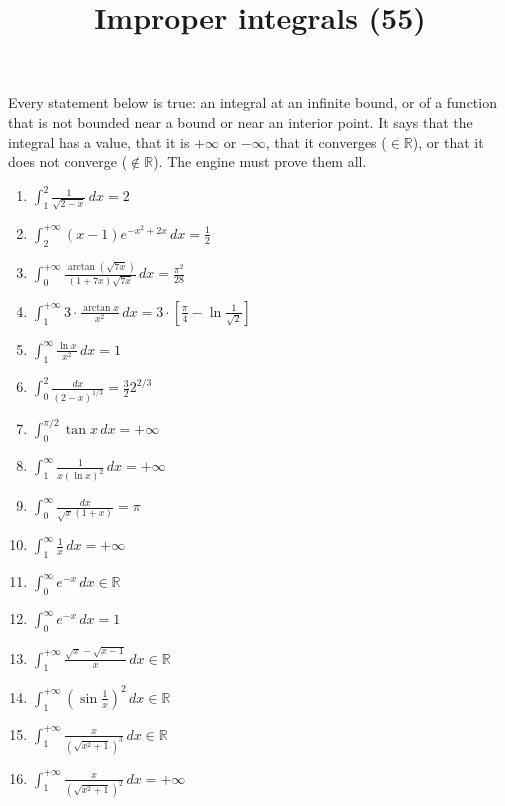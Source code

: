\documentclass[11pt,a4paper]{article}
\title{Improper integrals (55)}
\author{}
\date{}
\begin{document}
\maketitle
Every statement below is true: an integral at an infinite bound, or of a function that is not bounded near a bound or near an interior point. It says that the integral has a value, that it is $+\infty$ or $-\infty$, that it converges ($\in \mathbb{R}$), or that it does not converge ($\notin \mathbb{R}$). The engine must prove them all.

\begin{enumerate}
\item $\displaystyle \int_{1}^{2} \frac{1}{\sqrt{2 - x}} \, dx = 2$
\item $\displaystyle \int_{2}^{+\infty} (x - 1) e^{-x^{2} + 2x} \, dx = \frac{1}{2}$
\item $\displaystyle \int_{0}^{+\infty} \frac{\arctan\left(\sqrt{7x}\right)}{(1 + 7x)\sqrt{7x}} \, dx = \frac{\pi^{2}}{28}$
\item $\displaystyle \int_{1}^{+\infty} 3 \cdot \frac{\arctan x}{x^{2}} \, dx = 3 \cdot \left[\frac{\pi}{4} - \ln\frac{1}{\sqrt{2}}\right]$
\item $\displaystyle \int_{1}^{\infty} \frac{\ln x}{x^{2}} \, dx = 1$
\item $\displaystyle \int_{0}^{2} \frac{dx}{(2 - x)^{1/3}} = \frac{3}{2}2^{2/3}$
\item $\displaystyle \int_{0}^{\pi/2} \tan x \, dx = +\infty$
\item $\displaystyle \int_{1}^{\infty} \frac{1}{x(\ln x)^{2}} \, dx = +\infty$
\item $\displaystyle \int_{0}^{\infty} \frac{dx}{\sqrt{x}(1 + x)} = \pi$
\item $\displaystyle \int_{1}^{\infty} \frac{1}{x} \, dx = +\infty$
\item $\displaystyle \int_{0}^{\infty} e^{-x} \, dx \in \mathbb{R}$
\item $\displaystyle \int_{0}^{\infty} e^{-x} \, dx = 1$
\item $\displaystyle \int_{1}^{+\infty} \frac{\sqrt{x} - \sqrt{x - 1}}{x} \, dx \in \mathbb{R}$
\item $\displaystyle \int_{1}^{+\infty} \left(\sin\frac{1}{x}\right)^{2} \, dx \in \mathbb{R}$
\item $\displaystyle \int_{1}^{+\infty} \frac{x}{\left(\sqrt{x^{2} + 1}\right)^{3}} \, dx \in \mathbb{R}$
\item $\displaystyle \int_{1}^{+\infty} \frac{x}{\left(\sqrt{x^{2} + 1}\right)^{2}} \, dx = +\infty$

\end{enumerate}
\end{document}
